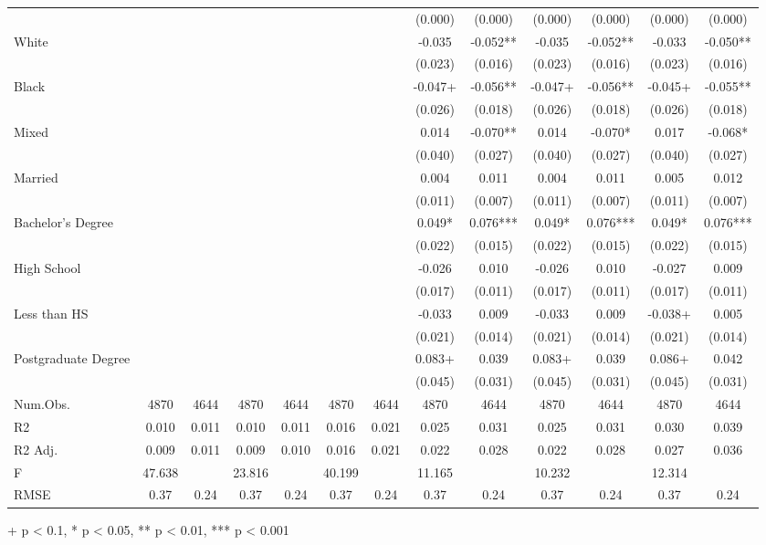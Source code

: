 \documentclass[
]{article}
\begin{document}
\begin{table}[t]
\begin{tabular*}{\linewidth}{@{\extracolsep{\fill}}lcccccccccccc}
 &  &  &  &  &  &  & (0.000) & (0.000) & (0.000) & (0.000) & (0.000) & (0.000) \\ 
White &  &  &  &  &  &  & -0.035 & -0.052** & -0.035 & -0.052** & -0.033 & -0.050** \\ 
 &  &  &  &  &  &  & (0.023) & (0.016) & (0.023) & (0.016) & (0.023) & (0.016) \\ 
Black &  &  &  &  &  &  & -0.047+ & -0.056** & -0.047+ & -0.056** & -0.045+ & -0.055** \\ 
 &  &  &  &  &  &  & (0.026) & (0.018) & (0.026) & (0.018) & (0.026) & (0.018) \\ 
Mixed &  &  &  &  &  &  & 0.014 & -0.070** & 0.014 & -0.070* & 0.017 & -0.068* \\ 
 &  &  &  &  &  &  & (0.040) & (0.027) & (0.040) & (0.027) & (0.040) & (0.027) \\ 
Married &  &  &  &  &  &  & 0.004 & 0.011 & 0.004 & 0.011 & 0.005 & 0.012 \\ 
 &  &  &  &  &  &  & (0.011) & (0.007) & (0.011) & (0.007) & (0.011) & (0.007) \\ 
Bachelor's Degree &  &  &  &  &  &  & 0.049* & 0.076*** & 0.049* & 0.076*** & 0.049* & 0.076*** \\ 
 &  &  &  &  &  &  & (0.022) & (0.015) & (0.022) & (0.015) & (0.022) & (0.015) \\ 
High School &  &  &  &  &  &  & -0.026 & 0.010 & -0.026 & 0.010 & -0.027 & 0.009 \\ 
 &  &  &  &  &  &  & (0.017) & (0.011) & (0.017) & (0.011) & (0.017) & (0.011) \\ 
Less than HS &  &  &  &  &  &  & -0.033 & 0.009 & -0.033 & 0.009 & -0.038+ & 0.005 \\ 
 &  &  &  &  &  &  & (0.021) & (0.014) & (0.021) & (0.014) & (0.021) & (0.014) \\ 
Postgraduate Degree &  &  &  &  &  &  & 0.083+ & 0.039 & 0.083+ & 0.039 & 0.086+ & 0.042 \\ 
{} & {} & {} & {} & {} & {} & {} & {(0.045)} & {(0.031)} & {(0.045)} & {(0.031)} & {(0.045)} & {(0.031)} \\ 
Num.Obs. & 4870 & 4644 & 4870 & 4644 & 4870 & 4644 & 4870 & 4644 & 4870 & 4644 & 4870 & 4644 \\ 
R2 & 0.010 & 0.011 & 0.010 & 0.011 & 0.016 & 0.021 & 0.025 & 0.031 & 0.025 & 0.031 & 0.030 & 0.039 \\ 
R2 Adj. & 0.009 & 0.011 & 0.009 & 0.010 & 0.016 & 0.021 & 0.022 & 0.028 & 0.022 & 0.028 & 0.027 & 0.036 \\ 
F & 47.638 &  & 23.816 &  & 40.199 &  & 11.165 &  & 10.232 &  & 12.314 &  \\ 
RMSE & 0.37 & 0.24 & 0.37 & 0.24 & 0.37 & 0.24 & 0.37 & 0.24 & 0.37 & 0.24 & 0.37 & 0.24 \\ 
\bottomrule
\end{tabular*}
\begin{minipage}{\linewidth}
+ p < 0.1, * p < 0.05, ** p < 0.01, *** p < 0.001\\
\end{minipage}
\end{table}
\end{document}
